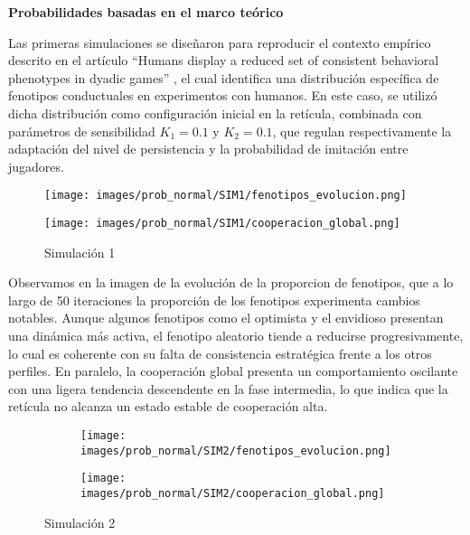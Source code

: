 \documentclass[a4paper,12pt]{report}
\begin{document}
\vspace{1.5em}
\noindent\textbf{Probabilidades basadas en el marco teórico}
\vspace{0.5em}


Las primeras simulaciones se diseñaron para reproducir el contexto empírico descrito en el artículo “Humans display a reduced set of consistent behavioral phenotypes in dyadic games” \cite{paper_principal}, el cual identifica una distribución específica de fenotipos conductuales en experimentos con humanos. En este caso, se utilizó dicha distribución como configuración inicial en la retícula, combinada con parámetros de sensibilidad \( K_1 = 0.1 \) y \( K_2 = 0.1 \), que regulan respectivamente la adaptación del nivel de persistencia y la probabilidad de imitación entre jugadores.

\begin{figure}[h]
    \centering
    \begin{minipage}{0.49\textwidth}
    \centering
    \texttt{[image: images/prob\_normal/SIM1/fenotipos\_evolucion.png]}
    \label{fig:fenotipos-sim1}
    \end{minipage}
    \hfill
    \begin{minipage}{0.49\textwidth}
    \centering
    \texttt{[image: images/prob\_normal/SIM1/cooperacion\_global.png]}
    \label{fig:cooperacion-sim1}
    \end{minipage}
    \caption{Simulación 1}
\end{figure}

Observamos en la imagen de la evolución de la proporcion de fenotipos, que a lo largo de 50 iteraciones la proporción de los fenotipos experimenta cambios notables. Aunque algunos fenotipos como el optimista y el envidioso presentan una dinámica más activa, el fenotipo aleatorio tiende a reducirse progresivamente, lo cual es coherente con su falta de consistencia estratégica frente a los otros perfiles. En paralelo, la cooperación global presenta un comportamiento oscilante con una ligera tendencia descendente en la fase intermedia, lo que indica que la retícula no alcanza un estado estable de cooperación alta.

\begin{figure}[h]
    \centering
    \begin{subfigure}[t]{0.49\textwidth}
        \centering
        \texttt{[image: images/prob\_normal/SIM2/fenotipos\_evolucion.png]}
        \label{fig:enter-label}
    \end{subfigure}
    \hfill
    \begin{subfigure}[t]{0.49\textwidth}
        \centering
        \texttt{[image: images/prob\_normal/SIM2/cooperacion\_global.png]}
        \label{fig:enter-label}
    \end{subfigure}
    \caption{Simulación 2}
\end{figure}
\end{document}
